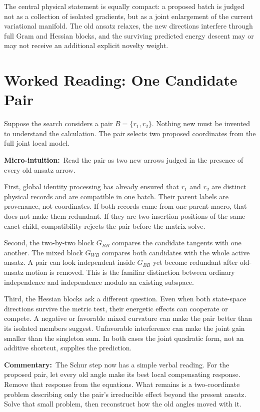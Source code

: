 \documentclass[10pt,twocolumn]{article}
\newcommand{\micro}[1]{\par\noindent\textbf{Micro-intuition:}\ #1\par}
\newcommand{\commentary}[1]{\par\noindent\textbf{Commentary:}\ #1\par}
\begin{document}
The central physical statement is equally compact: a proposed batch is judged
not as a collection of isolated gradients, but as a joint enlargement of the
current variational manifold. The old ansatz relaxes, the new directions
interfere through full Gram and Hessian blocks, and the surviving predicted
energy descent may or may not receive an additional explicit novelty weight.

\section*{Worked Reading: One Candidate Pair}

Suppose the search considers a pair \(B=\{r_1,r_2\}\). Nothing new must be
invented to understand the calculation. The pair selects two proposed
coordinates from the full joint local model.

\micro{Read the pair as two new arrows judged in the presence of every old
ansatz arrow.}

First, global identity processing has already ensured that \(r_1\) and
\(r_2\) are distinct physical records and are compatible in one batch. Their
parent labels are provenance, not coordinates. If both records came from one
parent macro, that does not make them redundant. If they are two insertion
positions of the same exact child, compatibility rejects the pair before the
matrix solve.

Second, the two-by-two block \(G_{BB}\) compares the candidate tangents with
one another. The mixed block \(G_{WB}\) compares both candidates with the
whole active ansatz. A pair can look independent inside \(G_{BB}\) yet become
redundant after old-ansatz motion is removed. This is the familiar distinction
between ordinary independence and independence modulo an existing subspace.

Third, the Hessian blocks ask a different question. Even when both state-space
directions survive the metric test, their energetic effects can cooperate or
compete. A negative or favorable mixed curvature can make the pair better than
its isolated members suggest. Unfavorable interference can make the joint gain
smaller than the singleton sum. In both cases the joint quadratic form, not an
additive shortcut, supplies the prediction.

\commentary{The Schur step now has a simple verbal reading. For the proposed
pair, let every old angle make its best local compensating response. Remove
that response from the equations. What remains is a two-coordinate problem
describing only the pair's irreducible effect beyond the present ansatz. Solve
that small problem, then reconstruct how the old angles moved with it.}
\end{document}
